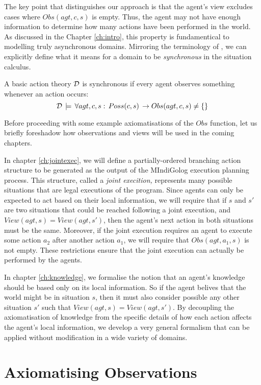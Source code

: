 The key point that distinguishes our approach is that the agent's
view excludes cases where $Obs(agt,c,s)$ is empty. Thus, the agent
may not have enough information to determine how many actions have
been performed in the world. As discussed in the Chapter \ref{ch:intro},
this property is fundamentical to modelling truly asynchronous domains.
Mirroring the terminology of \citep{vanBentham06tree_of_knowledge},
we can explicitly define what it means for a domain to be \emph{synchronous}
in the situation calculus\emph{.\newpage{}}

\begin{defnL}
 A basic action theory $\mathcal{D}$
is synchronous if every agent observes something whenever an action
occurs:\[
\mathcal{D}\,\models\,\forall agt,c,s:\, Poss(c,s)\,\rightarrow Obs(agt,c,s)\neq\{\}\]

\end{defnL}
Before proceeding with some example axiomatisations of the $Obs$
function, let us briefly foreshadow how observations and views will
be used in the coming chapters.

In chapter \ref{ch:jointexec}, we will define a partially-ordered
branching action structure to be generated as the output of the MIndiGolog
execution planning process. This structure, called a \emph{joint execition,}
represents many possible situations that are legal executions of the
program. Since agents can only be expected to act based on their local
information, we will require that if $s$ and $s'$ are two situations
that could be reached following a joint execution, and $View(agt,s)=View(agt,s')$,
then the agent's next action in both situations must be the same.
Moreover, if the joint execution requires an agent to execute some
action $a_{2}$ after another action $a_{1}$, we will require that
$Obs(agt,a_{1},s)$ is not empty. These restrictions ensure that the
joint execution can actually be performed by the agents.

In chapter \ref{ch:knowledge}, we formalise the notion that an agent's
knowledge should be based only on its local information. So if the
agent belives that the world might be in situation $s$, then it must
also consider possible any other situation $s'$ such that $View(agt,s)=View(agt,s')$.
By decoupling the axiomatisation of knowledge from the specific details
of how each action affects the agent's local information, we develop
a very general formalism that can be applied without modification
in a wide variety of domains.


\section{Axiomatising Observations\label{sec:Observations:Axiomatising-simple}}

